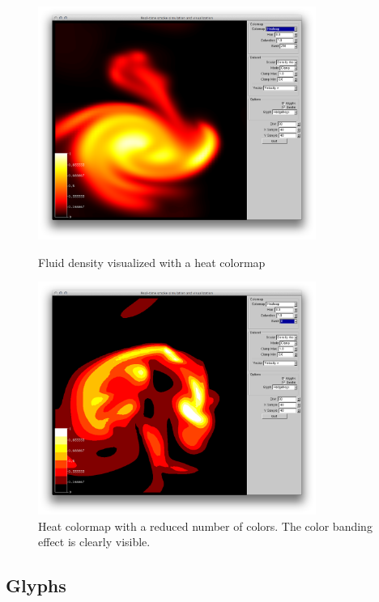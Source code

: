 \begin{figure}[htbp]
\centering
\begin{minipage}[t]{0.48\textwidth}
        \includegraphics[height=3in]{figures/colormaps/heatmapSmoke.png}
\caption{Fluid density visualized with a heat colormap}
\label{fig:heatmap}
\end{minipage}\hspace{.04\textwidth}%
\begin{minipage}[t]{0.48\textwidth}
        \includegraphics[height=3in]{figures/colormaps/heatmapSmokeBanded.png}
    \caption{Heat colormap with a reduced number of colors. The color banding effect is clearly visible.}
    \label{fig:banding}
\end{minipage}
\end{figure}

\clearpage

\subsection{Glyphs}
\label{sec:glyphs}


